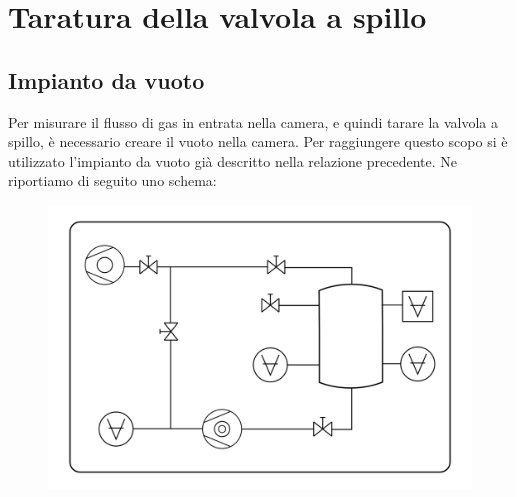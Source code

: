 \documentclass[11pt]{article}
\begin{document}
\section{Taratura della valvola a spillo}
\subsection{Impianto da vuoto}
Per misurare il flusso di gas in entrata nella camera, e quindi tarare la valvola a spillo, è necessario creare il vuoto nella camera. Per raggiungere questo scopo si è utilizzato l'impianto da vuoto già descritto nella relazione precedente. Ne riportiamo di seguito uno schema:
\vspace{-10 pt} 
 \begin{center} 
\begin{figure}[H]
\hspace{-30.5pt}
\includegraphics[scale=0.4]{schema_finale.png}


\end{figure}
\end{center}
\end{document}
